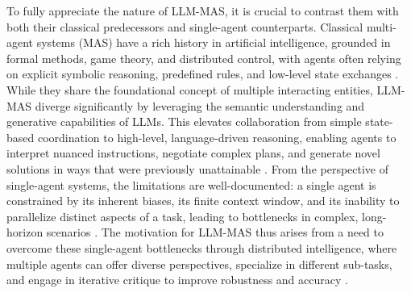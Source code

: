 \documentclass[11pt]{article}
\begin{document}
To fully appreciate the nature of LLM-MAS, it is crucial to contrast them with both their classical predecessors and single-agent counterparts. Classical multi-agent systems (MAS) have a rich history in artificial intelligence, grounded in formal methods, game theory, and distributed control, with agents often relying on explicit symbolic reasoning, predefined rules, and low-level state exchanges \cite{ref3}. While they share the foundational concept of multiple interacting entities, LLM-MAS diverge significantly by leveraging the semantic understanding and generative capabilities of LLMs. This elevates collaboration from simple state-based coordination to high-level, language-driven reasoning, enabling agents to interpret nuanced instructions, negotiate complex plans, and generate novel solutions in ways that were previously unattainable \cite{ref4}. From the perspective of single-agent systems, the limitations are well-documented: a single agent is constrained by its inherent biases, its finite context window, and its inability to parallelize distinct aspects of a task, leading to bottlenecks in complex, long-horizon scenarios \cite{ref2}. The motivation for LLM-MAS thus arises from a need to overcome these single-agent bottlenecks through distributed intelligence, where multiple agents can offer diverse perspectives, specialize in different sub-tasks, and engage in iterative critique to improve robustness and accuracy \cite{ref5}.
\end{document}
